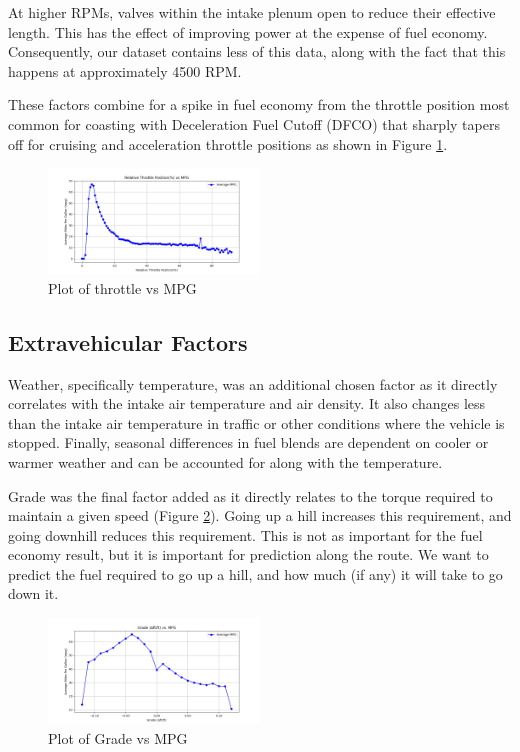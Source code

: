 \documentclass[letterpaper]{article}
\begin{document}
At higher RPMs, valves within the intake plenum open to reduce their 
effective length. This has the effect of improving power at the expense 
of fuel economy. Consequently, our dataset contains less of this data, 
along with the fact that this happens at approximately 4500 RPM.

These factors combine for a spike in fuel economy from the throttle 
position most common for coasting with Deceleration Fuel Cutoff (DFCO) 
that sharply tapers off for cruising and acceleration throttle positions 
as shown in Figure \ref{fig:throttlevsmpg}. 

\begin{figure}[htbp]
    \centering
    \includegraphics[width=0.5\textwidth]{figures/throttle_vs_mpg.png}
    \caption{Plot of throttle vs MPG}
    \label{fig:throttlevsmpg}
\end{figure}

\subsection*{Extravehicular Factors}

Weather, specifically temperature, was an additional chosen factor as it 
directly correlates with the intake air temperature and air density. It 
also changes less than the intake air temperature in traffic or other 
conditions where the vehicle is stopped. Finally, seasonal differences in 
fuel blends are dependent on cooler or warmer weather and can be accounted 
for along with the temperature.

Grade was the final factor added as it directly relates to the torque 
required to maintain a given speed (Figure \ref{fig:gradevsmpg}). Going up 
a hill increases this requirement, and going downhill reduces this 
requirement. This is not as important for the fuel economy result, but it 
is important for prediction along the route. We want to predict the fuel 
required to go up a hill, and how much (if any) it will take to go down it. 

\begin{figure}[htbp]
    \centering
    \includegraphics[width=0.5\textwidth]{figures/grade_vs_mpg.png}
    \caption{Plot of Grade vs MPG}
    \label{fig:gradevsmpg}
\end{figure}
\end{document}

